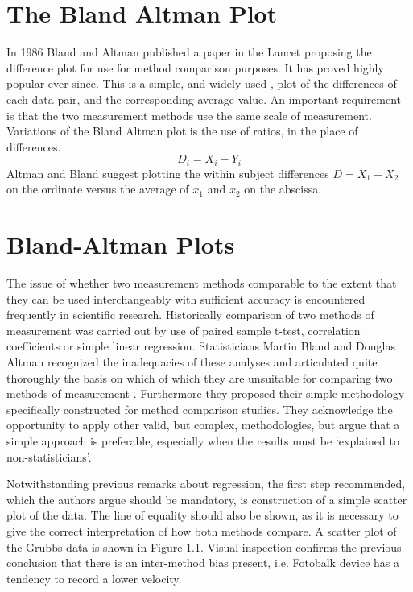 \documentclass[12pt, a4paper]{report}
\begin{document}
	\section{The Bland Altman Plot}
	In 1986 Bland and Altman published a paper in the Lancet proposing
	the difference plot for use for method comparison purposes. It has
	proved highly popular ever since. This is a simple, and widely
	used , plot of the differences of each data pair, and the
	corresponding average value. An important requirement is that the
	two measurement methods use the same scale of measurement.
	\\
	Variations of the Bland Altman plot is the use of ratios, in the
	place of differences.
	\begin{equation}
	D_{i} = X_{i} - Y_{i}   \label{BA01}
	\end{equation}
	Altman and Bland suggest plotting the within subject differences $
	D = X_{1} - X_{2} $ on the ordinate versus the average of $x_{1}$
	and  $x_{2}$ on the abscissa.
	

	
	
	\section{Bland-Altman Plots}
	The issue of whether two measurement methods comparable to the
	extent that they can be used interchangeably with sufficient
	accuracy is encountered frequently in scientific research.
	Historically comparison of two methods of measurement was carried
	out by use of paired sample t-test, correlation coefficients or
	simple linear regression. Statisticians Martin Bland and Douglas
	Altman recognized the inadequacies of these analyses and
	articulated quite thoroughly the basis on which of which they are
	unsuitable for comparing two methods of measurement \citep*{BA83}.
	Furthermore they proposed their simple methodology specifically
	constructed for method comparison studies. They acknowledge the
	opportunity to apply other valid, but complex, methodologies, but
	argue that a simple approach is preferable, especially when the
	results must be `explained to non-statisticians'.
	
	Notwithstanding previous remarks about regression, the first step
	recommended, which the authors argue should be mandatory, is
	construction of a simple scatter plot of the data. The line of
	equality should also be shown, as it is necessary to give the
	correct interpretation of how both methods compare. A scatter plot
	of the Grubbs data is shown in Figure 1.1. Visual inspection confirms the previous conclusion that there is an
	inter-method bias present, i.e. Fotobalk device has a tendency to
	record a lower velocity.
	
\end{document}
